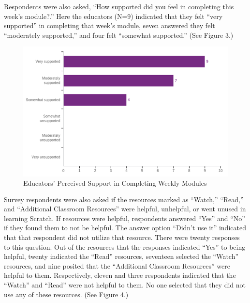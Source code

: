 \documentclass[11.5pt]{sig-alternate} %
\begin{document}
\begin{large}
Respondents were also asked, “How supported did you feel in completing this week’s module?.” Here the educators (N=9) indicated that they felt “very supported” in completing that week’s module, seven answered they felt “moderately supported,” and four felt “somewhat supported.” (See Figure 3.)

\begin{figure}[th]
    \includegraphics[width=\linewidth]{images/fig3.png}
    \caption{Educators’ Perceived Support in Completing Weekly Modules}
    \label{Figure 3}
\end{figure}

Survey respondents were also asked if the resources marked as  “Watch,” “Read,” and “Additional Classroom Resources” were helpful, unhelpful, or went unused in learning Scratch. If resources were helpful, respondents answered “Yes” and “No” if they found them to not be helpful. The answer option “Didn’t use it” indicated that that respondent did not utilize that resource. There were twenty responses to this question. Out of the resources that the responses indicated “Yes” to being helpful, twenty indicated the “Read” resources, seventeen selected the “Watch” resources, and nine posited that the “Additional Classroom Resources” were helpful to them. Respectively, eleven and three respondents indicated that the “Watch” and “Read” were not helpful to them. No one selected that they did not use any of these resources. (See Figure 4.)


\end{large}
\end{document}
